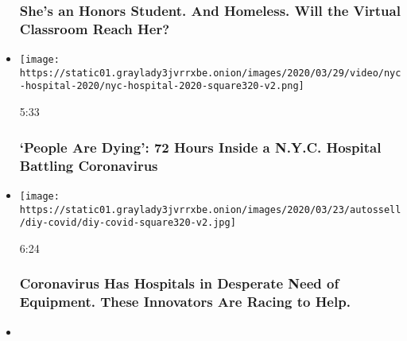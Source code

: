\begin{itemize}
{  \subsubsection{She's an Honors Student. And Homeless. Will the Virtual
  Classroom Reach
  Her?}\label{shes-an-honors-student-and-homeless-will-the-virtual-classroom-reach-her}}
\item
  \href{https://www.nytimes3xbfgragh.onion/video/nyregion/100000007052136/coronavirus-elmhurst-hospital-queens.html?action=click\&module=video-series-bar\&region=header\&pgtype=Article\&playlistId=video/coronavirus-news-update}{}

  \texttt{[image: https://static01.graylady3jvrrxbe.onion/images/2020/03/29/video/nyc-hospital-2020/nyc-hospital-2020-square320-v2.png]}

  5:33

  \hypertarget{people-are-dying-72-hours-inside-a-nyc-hospital-battling-coronavirus}{%
  \subsubsection{`People Are Dying': 72 Hours Inside a N.Y.C. Hospital
  Battling
  Coronavirus}\label{people-are-dying-72-hours-inside-a-nyc-hospital-battling-coronavirus}}
\item
  \href{https://www.nytimes3xbfgragh.onion/video/us/100000007046207/coronavirus-innovative-equipment.html?action=click\&module=video-series-bar\&region=header\&pgtype=Article\&playlistId=video/coronavirus-news-update}{}

  \texttt{[image: https://static01.graylady3jvrrxbe.onion/images/2020/03/23/autossell/diy-covid/diy-covid-square320-v2.jpg]}

  6:24

  \hypertarget{coronavirus-has-hospitals-in-desperate-need-of-equipment-these-innovators-are-racing-to-help}{%
  \subsubsection{Coronavirus Has Hospitals in Desperate Need of
  Equipment. These Innovators Are Racing to
  Help.}\label{coronavirus-has-hospitals-in-desperate-need-of-equipment-these-innovators-are-racing-to-help}}
\item
  \href{https://www.nytimes3xbfgragh.onion/video/world/americas/100000007049738/as-coronavirus-approaches-mexico-president-looks-other-way.html?action=click\&module=video-series-bar\&region=header\&pgtype=Article\&playlistId=video/coronavirus-news-update}{}


\end{itemize}
